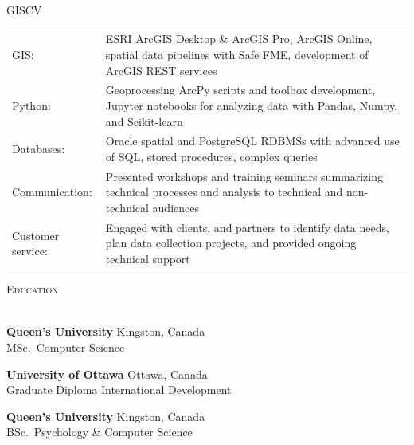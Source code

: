 \documentclass[letterpaper]{article}
\newcommand{\lineunder} {
        \vspace*{-8pt} \\
        \hspace*{-18pt} \hrulefill \\
    }
\newcommand{\header} [1] {
        {\hspace*{-18pt}\vspace*{6pt} \textsc{#1}}
        \vspace*{-6pt} \lineunder
        \vspace{1mm}
    }
\newcommand{\university}[3]{
        \textbf{#1}  %
        \hfill #2\\  %
        #3\\         %
        \vspace{2mm}
    }
\begin{document}
    \begin{taggedblock}{GISCV}
        \begin{tabular}[t]{ l L{5.17in} }
            GIS:& 
                ESRI ArcGIS Desktop \& ArcGIS Pro, ArcGIS Online, spatial data
                pipelines with Safe FME, development of ArcGIS REST services
                \\
            Python:& 
                Geoprocessing ArcPy scripts and toolbox development, Jupyter notebooks 
                for analyzing data with Pandas, Numpy, and Scikit-learn
                \\
            Databases:& 
                Oracle spatial and PostgreSQL RDBMSs with advanced use of SQL,
                stored procedures, complex queries
                \\
            Communication: &
                Presented workshops and training seminars summarizing technical
                processes and analysis to technical and non-technical audiences
                \\
            Customer service: &
                Engaged with clients, and partners to identify data needs, plan data
                collection projects, and provided ongoing technical support
                \\
        \end{tabular}
    \end{taggedblock}

\vspace{1mm}



\header{Education}
    \university
        {Queen's University}
        {Kingston, Canada}
        {MSc.~Computer Science}

    \university
        {University of Ottawa}
        {Ottawa, Canada}
        {Graduate Diploma International Development}

    \university
        {Queen's University}
        {Kingston, Canada}
        {BSc.~Psychology \& Computer Science}
\end{document}
